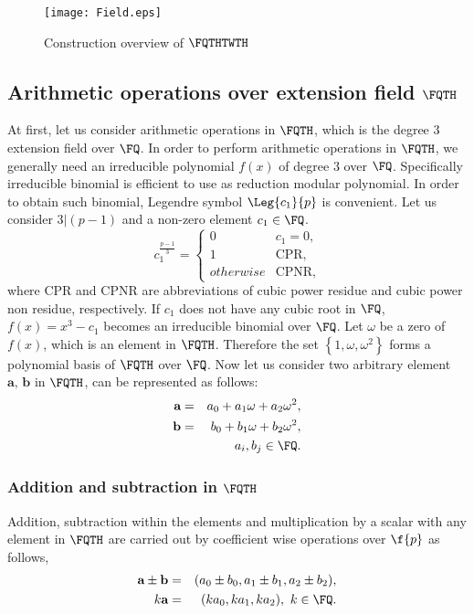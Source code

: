 \begin{figure*}
\centering
\texttt{[image: Field.eps]}
\caption{Construction overview of $\FQTHTWTH$}
\label{fig_field}
\end{figure*}

\subsection{Arithmetic operations over extension field $\FQTH$}
At first, let us consider arithmetic operations in $\FQTH$, which is the degree $3$ extension field over $\FQ$. 
In order to perform arithmetic operations in $\FQTH$, we generally need an irreducible polynomial $f(x)$ of degree $3$ over $\FQ$. Specifically irreducible binomial is efficient to use as reduction modular polynomial. In order to obtain such binomial, Legendre symbol $\Leg{c_1}{p}$ is convenient.
Let us consider $3|(p-1)$ and a non-zero element $c_1 \in \FQ$. 
\begin{equation}\label{eq:legndre_3}
c_1^{\frac{p-1}{3}} = 
\begin{cases}
  0 \quad & \mbox{$c_1 = 0$},\\
  1 \quad &\mbox{CPR},\\
  otherwise & \mbox{CPNR},
\end{cases}
\end{equation}
where CPR and CPNR are abbreviations of cubic power residue and cubic power non residue, respectively. If $c_1$ does not have any cubic root in $\FQ$, $f(x) =x^3 - c_1$ becomes an irreducible binomial over $\FQ$. Let $\omega$ be a zero of $f(x)$, which is an element in $\FQTH$. Therefore the set $\left\lbrace 1, \omega, \omega^2 \right\rbrace $ forms a polynomial basis of $\FQTH$ over $\FQ$. Now let us consider two arbitrary element $\textbf{a, b}$ in $\FQTH$, can be represented as follows:
\begin{eqnarray}\label{eq:vec_A_Fq_3}
\textbf{a} & = & a_0 + a_1\omega+ a_2\omega^2,  \nonumber \\ 
\textbf{b} & = & b_0 + b_1\omega+ b_2\omega^2,  \nonumber \\
& & a_i, b_j \in \FQ .  \nonumber
\end{eqnarray} 

\subsubsection{Addition and subtraction in $\FQTH$}
Addition, subtraction within the elements and multiplication by a scalar with any element in $\FQTH$ are carried out by coefficient wise operations over $\f{p}$ as follows,
\begin{eqnarray}\label{eq:add_sub_fq3}
\textbf{a} \pm \textbf{b} & = &  (a_0 \pm b_0, a_1 \pm b_1, a_2 \pm b_2), \\
k\textbf{a} & = &  (ka_0,  ka_1,ka_2),  \mbox{ $k \in \FQ$}.
\end{eqnarray}

